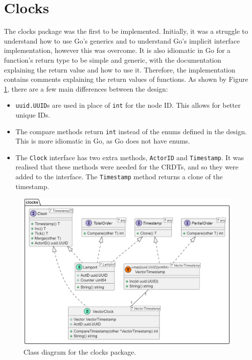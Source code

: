 \documentclass[12pt]{report}
\begin{document}
\section{Clocks}
The clocks package was the first to be implemented. Initially, it was a struggle to understand how to use Go's generics and to understand Go's implicit interface implementation, however this was overcome. It is also idiomatic in Go for a function's return type to be simple and generic, with the documentation explaining the return value and how to use it. Therefore, the implementation contains comments explaining the return values of functions. As shown by Figure \ref{fig:clockimpl}, there are a few main differences between the design:

\begin{itemize}
    \item \texttt{uuid.UUID}s are used in place of \texttt{int} for the node ID. This allows for better unique IDs.
    \item The compare methods return \texttt{int} instead of the enums defined in the design. This is more idiomatic in Go, as Go does not have enums.
    \item The \texttt{Clock} interface has two extra methods, \texttt{ActorID} and \texttt{Timestamp}. It was realised that these methods were needed for the CRDTs, and so they were added to the interface. The \texttt{Timestamp} method returns a clone of the timestamp.
\end{itemize}

\begin{figure}[h]
    \centering
    \includegraphics[width=1\textwidth]{images/clocks_impl.jpg}
    \caption{Class diagram for the clocks package.}
    \label{fig:clockimpl}
\end{figure}
\end{document}
